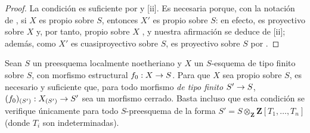 \documentclass[oneside,10pt]{amsart}
\makeatletter
\newcommand{\ega@arrow}[2]{\mathchoice{#1}{#2}{#2}{#2}}
\renewcommand{\to}{\ega@arrow{\longrightarrow}{\rightarrow}}
\let\EGAOriginalLabel\label
\renewcommand{\label}[1]{\phantomsection\EGAOriginalLabel{#1}}
\makeatother
\begin{document}
\begin{proof}
La condición es suficiente por  y [ii].
Es necesaria porque, con la notación de , si $X$ es propio sobre $S$, entonces $X'$ es propio sobre $S$: en efecto, es proyectivo sobre $X$ y, por tanto, propio sobre $X$ , y nuestra afirmación se deduce de [ii]; además, como $X'$ es cuasiproyectivo sobre $S$, es proyectivo sobre $S$ por .
\end{proof}

\begin{corollary}[5.6.3]
\label{II.5.6.3-fr}
Sean $S$ un preesquema localmente noetheriano y $X$ un $S$-esquema de tipo finito sobre $S$, con morfismo estructural $f_0:X\to S$.
Para que $X$ sea propio sobre $S$, es necesario y suficiente que, para todo morfismo \emph{de tipo finito} $S'\to S$, $(f_0)_{(S')}:X_{(S')}\to S'$ sea un morfismo cerrado.
Basta incluso que esta condición se verifique únicamente para todo $S$-preesquema de la forma $S'=S\otimes_{\mathbf Z}\mathbf Z[T_1,\ldots,T_n]$ (donde $T_i$ son indeterminadas).
\end{corollary}
\end{document}
